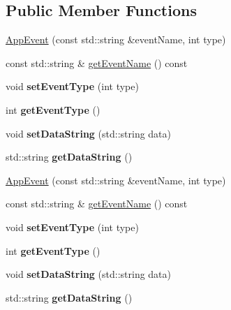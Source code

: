 \subsection*{Public Member Functions}
\begin{DoxyCompactItemize}
\item 
\hyperlink{classAppEvent_ad4f8b5ceebce8b4f5daa7e8cae41d234}{App\+Event} (const std\+::string \&event\+Name, int type)
\item 
const std\+::string \& \hyperlink{classAppEvent_accc9f3c863e33ebf227f251eb18a96e8}{get\+Event\+Name} () const
\item 
\mbox{\label{classAppEvent_afa51abac0c11330085a95581b688bf88}} 
void {\bfseries set\+Event\+Type} (int type)
\item 
\mbox{\label{classAppEvent_a0540d4fcd7b82bc6ff4a8586d6966df2}} 
int {\bfseries get\+Event\+Type} ()
\item 
\mbox{\label{classAppEvent_a7aebe287b6a6a2dcadbcfa6ad018aaf3}} 
void {\bfseries set\+Data\+String} (std\+::string data)
\item 
\mbox{\label{classAppEvent_a4adffc6bba6160951ea8ff87e6677657}} 
std\+::string {\bfseries get\+Data\+String} ()
\item 
\hyperlink{classAppEvent_ad4f8b5ceebce8b4f5daa7e8cae41d234}{App\+Event} (const std\+::string \&event\+Name, int type)
\item 
const std\+::string \& \hyperlink{classAppEvent_accc9f3c863e33ebf227f251eb18a96e8}{get\+Event\+Name} () const
\item 
\mbox{\label{classAppEvent_afa51abac0c11330085a95581b688bf88}} 
void {\bfseries set\+Event\+Type} (int type)
\item 
\mbox{\label{classAppEvent_a0540d4fcd7b82bc6ff4a8586d6966df2}} 
int {\bfseries get\+Event\+Type} ()
\item 
\mbox{\label{classAppEvent_a7aebe287b6a6a2dcadbcfa6ad018aaf3}} 
void {\bfseries set\+Data\+String} (std\+::string data)
\item 
\mbox{\label{classAppEvent_a4adffc6bba6160951ea8ff87e6677657}} 
std\+::string {\bfseries get\+Data\+String} ()
\end{DoxyCompactItemize}
